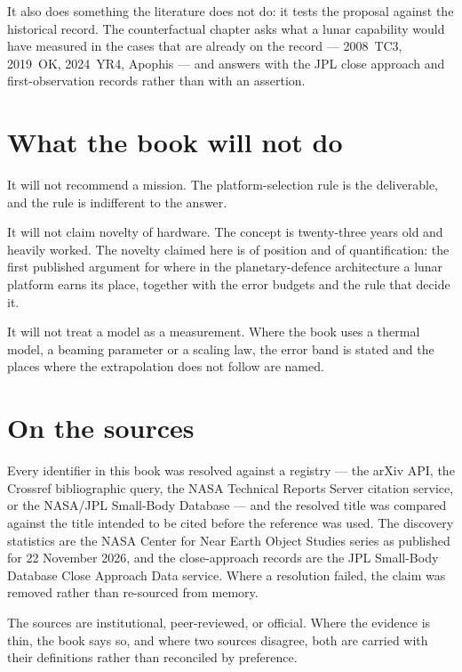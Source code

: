 It also does something the literature does not do: it tests the proposal
against the historical record. The counterfactual chapter asks what a lunar
capability would have measured in the cases that are already on the record ---
2008~TC3, 2019~OK, 2024~YR4, Apophis --- and answers with the JPL close
approach and first-observation records rather than with an assertion.

\section*{What the book will not do}

It will not recommend a mission. The platform-selection rule is the
deliverable, and the rule is indifferent to the answer.

It will not claim novelty of hardware. The concept is twenty-three years old
and heavily worked. The novelty claimed here is of position and of
quantification: the first published argument for where in the
planetary-defence architecture a lunar platform earns its place, together with
the error budgets and the rule that decide it.

It will not treat a model as a measurement. Where the book uses a thermal
model, a beaming parameter or a scaling law, the error band is stated and the
places where the extrapolation does not follow are named.

\section*{On the sources}

Every identifier in this book was resolved against a registry --- the arXiv
API, the Crossref bibliographic query, the NASA Technical Reports Server
citation service, or the NASA/JPL Small-Body Database --- and the resolved
title was compared against the title intended to be cited before the reference
was used. The discovery statistics are the NASA Center for Near Earth Object
Studies series as published for 22 November 2026, and the close-approach
records are the JPL Small-Body Database Close Approach Data service. Where a
resolution failed, the claim was removed rather than re-sourced from memory.

The sources are institutional, peer-reviewed, or official. Where the evidence
is thin, the book says so, and where two sources disagree, both are carried
with their definitions rather than reconciled by preference.


